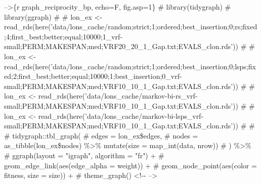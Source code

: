 \documentclass[
]{article}
\begin{document}
{{{--\textgreater{}}{\{r graph\_reciprocity\_bp, echo=F, fig.asp=1\} \# library(tidygraph) \# library(ggraph) \#  \# lon\_ex \textless- read\_rds(here('data/lons\_cache/random;strict;1;ordered;best\_insertion;0;rs;fixed;4;first\_best;better;equal;10000;1\_vrf-small;PERM;MAKESPAN;med;VRF20\_20\_1\_Gap.txt;EVALS\_clon.rds')) \# \# lon\_ex \textless- read\_rds(here('data/lons\_cache/random;strict;1;ordered;best\_insertion;0;lsps;fixed;2;first\_best;better;equal;10000;1;best\_insertion;0\_vrf-small;PERM;MAKESPAN;med;VRF10\_10\_1\_Gap.txt;EVALS\_clon.rds')) \# \# lon\_ex \textless- read\_rds(here('data/lons\_cache/markov-bi-rs\_vrf-small;PERM;MAKESPAN;med;VRF10\_10\_1\_Gap.txt;EVALS\_clon.rds')) \# \# lon\_ex \textless- read\_rds(here('data/lons\_cache/markov-bi-lsps\_vrf-small;PERM;MAKESPAN;med;VRF10\_10\_1\_Gap.txt;EVALS\_clon.rds')) \#  \#  \# tidygraph::tbl\_graph( \#    edges = lon\_ex\$edges, \#    nodes = as\_tibble(lon\_ex\$nodes) \%\textgreater\% mutate(size = map\_int(data, nrow)) \#  ) \%\textgreater\% \#  ggraph(layout = "igraph", algorithm = "fr") + \#  geom\_edge\_link(aes(edge\_alpha = weight)) + \#  geom\_node\_point(aes(color = fitness, size = size)) + \#  theme\_graph() \textless!-\/- --\textgreater{}}}\label{r-graph_reciprocity_bp-echof-fig.asp1-librarytidygraph-libraryggraph-lon_ex---read_rdsheredatalons_cacherandomstrict1orderedbest_insertion0rsfixed4first_bestbetterequal100001_vrf-smallpermmakespanmedvrf20_20_1_gap.txtevals_clon.rds-lon_ex---read_rdsheredatalons_cacherandomstrict1orderedbest_insertion0lspsfixed2first_bestbetterequal100001best_insertion0_vrf-smallpermmakespanmedvrf10_10_1_gap.txtevals_clon.rds-lon_ex---read_rdsheredatalons_cachemarkov-bi-rs_vrf-smallpermmakespanmedvrf10_10_1_gap.txtevals_clon.rds-lon_ex---read_rdsheredatalons_cachemarkov-bi-lsps_vrf-smallpermmakespanmedvrf10_10_1_gap.txtevals_clon.rds-tidygraphtbl_graph-edges-lon_exedges-nodes-as_tibblelon_exnodes-mutatesize-map_intdata-nrow-ggraphlayout-igraph-algorithm-fr-geom_edge_linkaesedge_alpha-weight-geom_node_pointaescolor-fitness-size-size-theme_graph---}}
\end{document}
